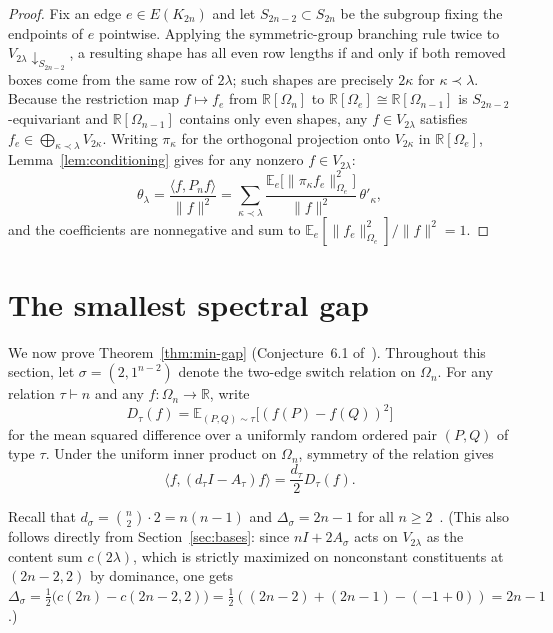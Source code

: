 \documentclass[11pt]{article}
\theoremstyle{remark}
\newcommand{\R}{\mathbb{R}}
\newcommand{\E}{\mathbb{E}}
\begin{document}
\begin{proof}
Fix an edge $e \in E(K_{2n})$ and let $S_{2n-2} \subset S_{2n}$ be the subgroup
fixing the endpoints of $e$ pointwise. Applying the symmetric-group branching
rule twice to $V_{2\lambda}\!\downarrow_{S_{2n-2}}$, a resulting shape has all
even row lengths if and only if both removed boxes come from the same row of
$2\lambda$; such shapes are precisely $2\kappa$ for $\kappa \prec \lambda$.
Because the restriction map $f \mapsto f_e$ from $\R[\Omega_n]$ to
$\R[\Omega_e] \cong \R[\Omega_{n-1}]$ is $S_{2n-2}$-equivariant and
$\R[\Omega_{n-1}]$ contains only even shapes, any $f \in V_{2\lambda}$
satisfies $f_e \in \bigoplus_{\kappa \prec \lambda} V_{2\kappa}$. Writing
$\pi_\kappa$ for the orthogonal projection onto $V_{2\kappa}$ in
$\R[\Omega_e]$, Lemma~\ref{lem:conditioning} gives for any nonzero
$f \in V_{2\lambda}$:
\[
  \theta_\lambda
  = \frac{\langle f, P_n f \rangle}{\|f\|^2}
  = \sum_{\kappa \prec \lambda}
    \frac{\E_e\bigl[\|\pi_\kappa f_e\|_{\Omega_e}^2\bigr]}{\|f\|^2}\, \theta'_\kappa,
\]
and the coefficients are nonnegative and sum to
$\E_e[\|f_e\|_{\Omega_e}^2] / \|f\|^2 = 1$.
\end{proof}

\section{The smallest spectral gap}\label{sec:min-gap}

We now prove Theorem~\ref{thm:min-gap} (Conjecture~6.1 of~\cite{GuptaEtAl}).
Throughout this section, let $\sigma = (2, 1^{n-2})$ denote the two-edge switch
relation on $\Omega_n$. For any relation $\tau \vdash n$ and any
$f \colon \Omega_n \to \R$, write
\[
  D_\tau(f) = \E_{(P, Q) \sim \tau}\bigl[(f(P) - f(Q))^2\bigr]
\]
for the mean squared difference over a uniformly random ordered pair $(P, Q)$
of type $\tau$. Under the uniform inner product on $\Omega_n$, symmetry of the
relation gives
\begin{equation}\label{eq:dirichlet}
  \langle f, (d_\tau I - A_\tau) f \rangle = \frac{d_\tau}{2} D_\tau(f).
\end{equation}

Recall that $d_\sigma = \binom{n}{2} \cdot 2 = n(n-1)$ and
$\Delta_\sigma = 2n - 1$ for all $n \ge 2$~\cite[§4]{GuptaEtAl}. (This also
follows directly from Section~\ref{sec:bases}: since $nI + 2A_\sigma$ acts on
$V_{2\lambda}$ as the content sum $c(2\lambda)$, which is strictly maximized on
nonconstant constituents at $(2n-2, 2)$ by dominance, one gets
$\Delta_\sigma = \frac{1}{2}\bigl(c(2n) - c(2n-2,2)\bigr) = \frac{1}{2}((2n-2)+(2n-1)-(-1+0)) = 2n - 1$.)
\end{document}
